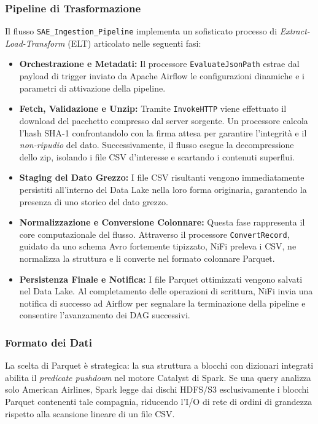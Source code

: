 \documentclass[conference]{IEEEtran}
\begin{document}
\subsubsection{Pipeline di Trasformazione}
Il flusso \texttt{SAE\_Ingestion\_Pipeline} implementa un sofisticato processo di \textit{Extract-Load-Transform} (ELT) articolato nelle seguenti fasi:
\begin{itemize}
    \item \textbf{Orchestrazione e Metadati:} Il processore \texttt{EvaluateJsonPath} estrae dal payload di trigger inviato da Apache Airflow le configurazioni dinamiche e i parametri di attivazione della pipeline.
    \item \textbf{Fetch, Validazione e Unzip:} Tramite \texttt{InvokeHTTP} viene effettuato il download del pacchetto compresso dal server sorgente.
    Un processore calcola l'hash SHA-1 confrontandolo con la firma attesa per garantire l'integrità e il \textit{non-ripudio} del dato.
    Successivamente, il flusso esegue la decompressione dello zip, isolando i file CSV d'interesse e scartando i contenuti superflui.
    \item \textbf{Staging del Dato Grezzo:} I file CSV risultanti vengono immediatamente persistiti all'interno del Data Lake nella loro forma originaria, garantendo la presenza di uno storico del dato grezzo.
    \item \textbf{Normalizzazione e Conversione Colonnare:} Questa fase rappresenta il core computazionale del flusso.
    Attraverso il processore \texttt{ConvertRecord}, guidato da uno schema Avro fortemente tipizzato, NiFi preleva i CSV, ne normalizza la struttura e li converte nel formato colonnare Parquet.
    \item \textbf{Persistenza Finale e Notifica:} I file Parquet ottimizzati vengono salvati nel Data Lake.
    Al completamento delle operazioni di scrittura, NiFi invia una notifica di successo ad Airflow per segnalare la terminazione della pipeline e consentire l'avanzamento dei DAG successivi.
\end{itemize}

\subsubsection{Formato dei Dati}
La scelta di Parquet è strategica: la sua struttura a blocchi con dizionari integrati abilita il \textit{predicate pushdown} nel motore Catalyst di Spark.
Se una query analizza solo American Airlines, Spark legge dai dischi HDFS/S3 esclusivamente i blocchi Parquet contenenti tale compagnia, riducendo l'I/O di rete di ordini di grandezza rispetto alla scansione lineare di un file CSV\@.
\end{document}
